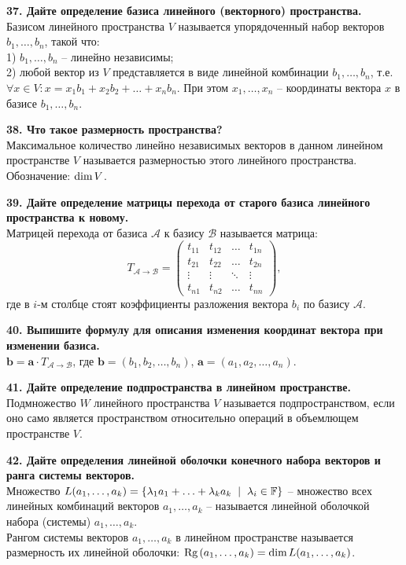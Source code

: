 \documentclass[11pt,a4paper]{article}
\newcommand{\F}{\mathbb{F}}
\renewcommand{\a}{\mathbf{a}}
\renewcommand{\b}{\mathbf{b}}
\newcommand{\A}{\mathcal{A}}
\newcommand{\B}{\mathcal{B}}
\newcommand{\Rg}[1]{\mathrm{Rg}\hspace{0.5mm}#1}
\newcommand{\Dim}[1]{\mathrm{dim}\hspace{0.5mm}#1}
\renewcommand{\mid}{\hspace{2mm}\middle|\hspace{2mm}}
\begin{document}
\textbf{37. Дайте определение базиса линейного (векторного) пространства.\\}
Базисом линейного пространства $V$ называется упорядоченный набор векторов $b_1, \hdots, b_n$, такой что:\\
1) $b_1, \hdots, b_n$ -- линейно независимы;\\
2) любой вектор из $V$ представляется в виде линейной комбинации $b_1, \hdots, b_n$, т.е. $\forall x \in V: x = x_1 b_1 + x_2 b_2 + \hdots + x_n b_n$. При этом $x_1, \hdots, x_n$ -- координаты вектора $x$ в базисе $b_1, \hdots, b_n$.
\pagebreak

\textbf{38. Что такое размерность пространства?\\}
Максимальное количество линейно независимых векторов в данном линейном пространстве $V$ называется размерностью этого линейного пространства. Обозначение: $\Dim{V}$.

\textbf{39. Дайте определение матрицы перехода от старого базиса линейного пространства к новому.\\}
Матрицей перехода от базиса $\A$ к базису $\B$ называется матрица:
$$T_{\A \rightarrow \B} =
\left( \begin{matrix}
t_{11} & t_{12} & \hdots & t_{1n} \\
t_{21} & t_{22} & \hdots & t_{2n} \\
\vdots & \vdots & \ddots & \vdots \\
t_{n1} & t_{n2} & \hdots & t_{nn}
\end{matrix} \right),$$
где в $i$-м столбце стоят коэффициенты разложения вектора $b_i$ по базису $\A$.

\textbf{40. Выпишите формулу для описания изменения координат вектора при изменении базиса.\\}
$\b = \a \cdot T_{\A \rightarrow \B}$, где $\b = \left( b_1, b_2, \hdots, b_n \right)$, $\a = \left( a_1, a_2, \hdots, a_n \right)$.

\textbf{41. Дайте определение подпространства в линейном пространстве.\\}
Подмножество $W$ линейного пространства $V$ называется подпространством, если оно само является пространством относительно операций в объемлющем пространстве $V$.

\textbf{42. Дайте определения линейной оболочки конечного набора векторов и ранга системы векторов.\\}
Множество $L(a_1, \hdots, a_k) = \left\{ \lambda_1 a_1 + \hdots + \lambda_k a_k \mid \lambda_i \in \F \right\}$ -- множество всех линейных комбинаций векторов $a_1, \hdots, a_k$ -- называется линейной оболочкой набора (системы) $a_1, \hdots, a_k$.\\
Рангом системы векторов $a_1, \hdots, a_k$ в линейном пространстве называется размерность их линейной оболочки: $\Rg{(a_1, \hdots, a_k)} = \Dim{L(a_1, \hdots, a_k)}$.
\end{document}
